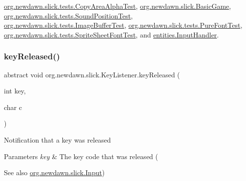 \mbox{\hyperlink{classorg_1_1newdawn_1_1slick_1_1tests_1_1_copy_area_alpha_test_ad3e659c4fc1026d613ffa7515ca21049}{org.\+newdawn.\+slick.\+tests.\+Copy\+Area\+Alpha\+Test}}, \mbox{\hyperlink{classorg_1_1newdawn_1_1slick_1_1_basic_game_a4fbb3345b5abf5ddd54a99466d07f02f}{org.\+newdawn.\+slick.\+Basic\+Game}}, \mbox{\hyperlink{classorg_1_1newdawn_1_1slick_1_1tests_1_1_sound_position_test_a3db7ea8dabda7d8bf211df4944993913}{org.\+newdawn.\+slick.\+tests.\+Sound\+Position\+Test}}, \mbox{\hyperlink{classorg_1_1newdawn_1_1slick_1_1tests_1_1_image_buffer_test_afd3aca2a853b70ccf8154376865bc287}{org.\+newdawn.\+slick.\+tests.\+Image\+Buffer\+Test}}, \mbox{\hyperlink{classorg_1_1newdawn_1_1slick_1_1tests_1_1_pure_font_test_adec56bd90adaf27d114e39cbb6b3c17b}{org.\+newdawn.\+slick.\+tests.\+Pure\+Font\+Test}}, \mbox{\hyperlink{classorg_1_1newdawn_1_1slick_1_1tests_1_1_sprite_sheet_font_test_a3466f33cbc843894f9974697fd988e74}{org.\+newdawn.\+slick.\+tests.\+Sprite\+Sheet\+Font\+Test}}, and \mbox{\hyperlink{classentities_1_1_input_handler_a9e9d7c64bd18e93dfb7d8247ab635036}{entities.\+Input\+Handler}}.

\mbox{\label{interfaceorg_1_1newdawn_1_1slick_1_1_key_listener_a474673b59bc77266bcef3c261c26ee2b}} 
\subsubsection{\texorpdfstring{key\+Released()}{keyReleased()}}
{\footnotesize\ttfamily abstract void org.\+newdawn.\+slick.\+Key\+Listener.\+key\+Released (\begin{DoxyParamCaption}\item[{int}]{key,  }\item[{char}]{c }\end{DoxyParamCaption})\hspace{0.3cm}{\ttfamily [abstract]}}

Notification that a key was released


\begin{DoxyParams}{Parameters}
{\em key} & The key code that was released (\\
\hline
\end{DoxyParams}
\begin{DoxySeeAlso}{See also}
\mbox{\hyperlink{classorg_1_1newdawn_1_1slick_1_1_input}{org.\+newdawn.\+slick.\+Input}}) 
\end{DoxySeeAlso}

